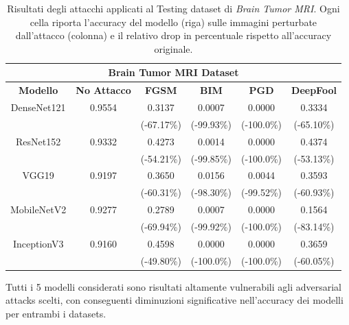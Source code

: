         \begin{table}[!h]
            \centering
            \begin{tabular}{|c||c||c|c|c|c|}
                \hline
                \multicolumn{6}{|c|}{\textbf{Brain Tumor MRI Dataset}} \rule[-3mm]{0mm}{8mm}\\
                \hline \hline
                \rule[-3mm]{0mm}{8mm}
                \textbf{Modello} & \textbf{No Attacco} & \textbf{FGSM} & \textbf{BIM} & \textbf{PGD} & \textbf{DeepFool} \\
                \hline \hline
                \rule[-3mm]{0mm}{8mm}
                DenseNet121 & 0.9554 & 0.3137 & 0.0007 & 0.0000 & 0.3334 \\
                 & & (-67.17\%) & (-99.93\%) & (-100.0\%) & (-65.10\%)\\
                \hline
                \rule[-3mm]{0mm}{8mm}
                ResNet152   & 0.9332 & 0.4273 & 0.0014 & 0.0000 & 0.4374 \\
                 & & (-54.21\%) & (-99.85\%) & (-100.0\%) & (-53.13\%)\\
                \hline
                \rule[-3mm]{0mm}{8mm}
                VGG19       & 0.9197 & 0.3650 & 0.0156 & 0.0044 & 0.3593 \\
                 & & (-60.31\%) & (-98.30\%) & (-99.52\%) & (-60.93\%)\\
                \hline
                \rule[-3mm]{0mm}{8mm}
                MobileNetV2 & 0.9277 & 0.2789 & 0.0007 & 0.0000 & 0.1564 \\
                 & & (-69.94\%) & (-99.92\%) & (-100.0\%) & (-83.14\%)\\
                \hline
                \rule[-3mm]{0mm}{8mm}
                InceptionV3 & 0.9160 & 0.4598 & 0.0000 & 0.0000 & 0.3659 \\
                 & & (-49.80\%) & (-100.0\%) & (-100.0\%) & (-60.05\%)\\
                \hline
            \end{tabular}
            \caption{Risultati degli attacchi applicati al Testing dataset di \textit{Brain Tumor MRI}. Ogni cella riporta l'accuracy del modello (riga) sulle immagini perturbate dall'attacco (colonna) e il relativo drop in percentuale rispetto all'accuracy originale.}
            \label{Attacks Results Brain Tumor MRI}
        \end{table}
    
    \newpage
    Tutti i 5 modelli considerati sono risultati altamente vulnerabili agli adversarial attacks scelti, con conseguenti diminuzioni significative nell'accuracy dei modelli per entrambi i datasets. 
    
